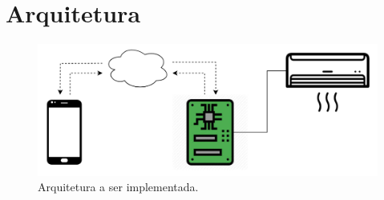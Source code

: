 \chapter{Arquitetura}
\label{chapter:arquitetura}

\begin{figure}[H]
	\centering
	\includegraphics[width=0.8\columnwidth]{figuras/Architecture_Block_Diagram}
	\caption{Arquitetura a ser implementada.}
	\label{fig:Architecture_Block_Diagram}
\end{figure}
